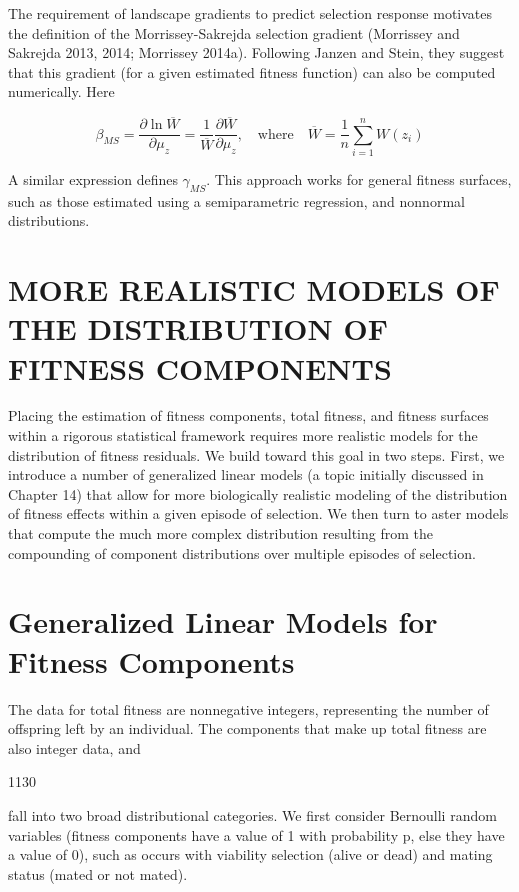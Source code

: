 \documentclass{article}
\begin{document}
The requirement of landscape gradients to predict selection response motivates the definition of the Morrissey-Sakrejda selection gradient (Morrissey and Sakrejda 2013, 2014; Morrissey 2014a). Following Janzen and Stein, they suggest that this gradient (for a given estimated fitness function) can also be computed numerically. Here

\begin{equation}
\beta_{M S}=\frac{\partial\ln\overline{W}}{\partial\mu_{z}}=\frac{1}{\overline{W}}\frac{\partial\overline{W}}{\partial\mu_{z}},\quad\mathrm{w h e r e}\quad\overline{W}=\frac{1}{n}\sum_{i=1}^{n}W(z_{i})
\tag{29.35d}
\label{eq:29_35d}
\end{equation}

A similar expression defines  $ \gamma_{MS} $. This approach works for general fitness surfaces, such as those estimated using a semiparametric regression, and nonnormal distributions.

\section{MORE REALISTIC MODELS OF THE DISTRIBUTION OF FITNESS COMPONENTS}
Placing the estimation of fitness components, total fitness, and fitness surfaces within a rigorous statistical framework requires more realistic models for the distribution of fitness residuals. We build toward this goal in two steps. First, we introduce a number of generalized linear models (a topic initially discussed in Chapter 14) that allow for more biologically realistic modeling of the distribution of fitness effects within a given episode of selection. We then turn to aster models that compute the much more complex distribution resulting from the compounding of component distributions over multiple episodes of selection.

\section{Generalized Linear Models for Fitness Components}
The data for total fitness are nonnegative integers, representing the number of offspring left by an individual. The components that make up total fitness are also integer data, and

1130

fall into two broad distributional categories. We first consider Bernoulli random variables (fitness components have a value of 1 with probability p, else they have a value of 0), such as occurs with viability selection (alive or dead) and mating status (mated or not mated).
\end{document}
